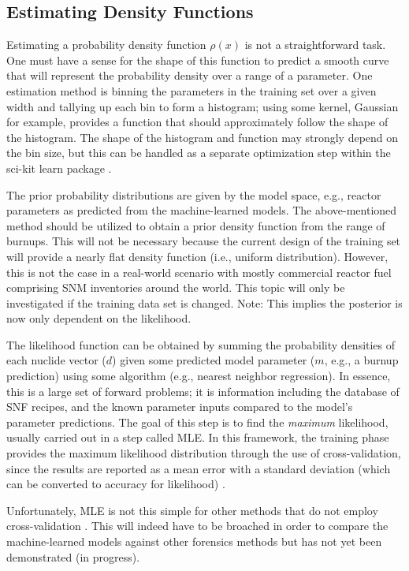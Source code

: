 \subsection{Estimating Density Functions}

Estimating a probability density function $\rho(x)$ is not a straightforward
task.  One must have a sense for the shape of this function to predict a smooth
curve that will represent the probability density over a range of a parameter.
One estimation method is binning the parameters in the training set over a
given width and tallying up each bin to form a histogram; using some kernel,
Gaussian for example, provides a function that should approximately follow the
shape of the histogram. The shape of the histogram and function may strongly
depend on the bin size, but this can be handled as a separate optimization step
within the sci-kit learn package \cite{scikit}.

The prior probability distributions are given by the model space, e.g., reactor
parameters as predicted from the machine-learned models.  The above-mentioned
method should be utilized to obtain a prior density function from the range of
burnups.  This will not be necessary because the current design of the training
set will provide a nearly flat density function (i.e., uniform distribution).
However, this is not the case in a real-world scenario with mostly commercial
reactor fuel comprising \gls{SNM} inventories around the world.  This topic
will only be investigated if the training data set is changed.
\cite{bayes_compare} Note: This implies the posterior is now only dependent on
the likelihood.

The likelihood function can be obtained by summing the probability densities of
each nuclide vector ($d$) given some predicted model parameter ($m$, e.g., a
burnup prediction) using some algorithm (e.g., nearest neighbor regression).
In essence, this is a large set of forward problems; it is information
including the database of \gls{SNF} recipes, and the known parameter inputs
compared to the model's parameter predictions.  The goal of this step is to
find the \textit{maximum} likelihood, usually carried out in a step called
\gls{MLE}. In this framework, the training phase provides the maximum
likelihood distribution through the use of cross-validation, since the results
are reported as a mean error with a standard deviation (which can be
converted to accuracy for likelihood) \cite{scikit}. 

Unfortunately, \gls{MLE} is not this simple for other methods that do not
employ cross-validation \cite{gentle_bayes, bayes_compare}. This will indeed
have to be broached in order to compare the machine-learned models against
other forensics methods but has not yet been demonstrated (in progress).


